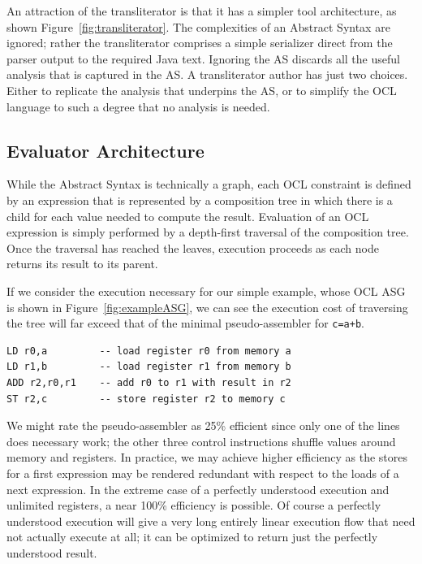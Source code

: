\documentclass[sigconf]{acmart}
\begin{document}
An attraction of the transliterator is that it has a simpler tool architecture, as shown Figure~\ref{fig:transliterator}. The complexities of an Abstract Syntax are ignored; rather the transliterator comprises a simple serializer direct from the parser output to the required Java text. Ignoring the AS discards all the useful analysis that is captured in the AS. A transliterator author has just two choices. Either to replicate the analysis that underpins the AS, or to simplify the OCL language to such a degree that no analysis is needed.

\subsection{Evaluator Architecture}

While the Abstract Syntax is technically a graph, each OCL constraint is defined by an expression that is represented by a composition tree in which there is a child for each value needed to compute the result. Evaluation of an OCL expression is simply performed by a depth-first traversal of the composition tree. Once the traversal has reached the leaves, execution proceeds as each node returns its result to its parent.

If we consider the execution necessary for our simple example, whose OCL ASG is shown in Figure~\ref{fig:exampleASG}, we can see the execution cost of traversing the tree will far exceed that of the minimal pseudo-assembler for \verb|c=a+b|.

\begin{verbatim}
LD r0,a         -- load register r0 from memory a
LD r1,b         -- load register r1 from memory b
ADD r2,r0,r1    -- add r0 to r1 with result in r2
ST r2,c         -- store register r2 to memory c
\end{verbatim}

We might rate the pseudo-assembler as 25\% efficient since only one of the lines does necessary work; the other three control instructions shuffle values around memory and registers. In practice, we may achieve higher efficiency as the stores for a first expression may be rendered redundant with respect to the loads of a next expression. In the extreme case of a perfectly understood execution and unlimited registers, a near 100\% efficiency is possible. Of course a perfectly understood execution will give a very long entirely linear execution flow that need not actually execute at all; it can be optimized to return just the perfectly understood result.
\end{document}
